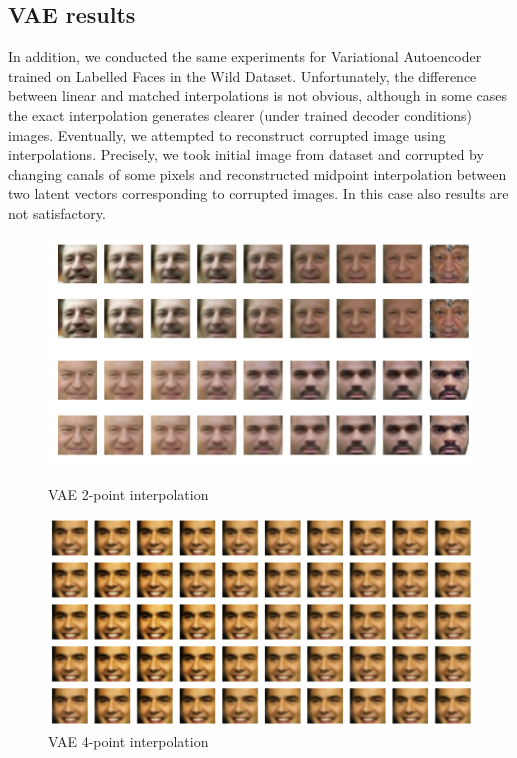 \documentclass{article}
\begin{document}
\subsection{VAE results}
In addition, we conducted the same experiments for Variational Autoencoder trained on Labelled Faces in the Wild Dataset. Unfortunately, the difference between linear and matched interpolations is not obvious, although in some cases the exact interpolation generates clearer (under trained decoder conditions) images. Eventually, we attempted to reconstruct corrupted image using interpolations. Precisely, we took initial image from dataset and corrupted by changing canals of some pixels and reconstructed midpoint interpolation between two latent vectors corresponding to corrupted images. In this case also results are not satisfactory. 



\begin{center}
\begin{figure}
    \includegraphics[width=\linewidth]{report/vae_int2_1.png}
    \includegraphics[width=\linewidth]{report/vae_int2_2.png}
    \caption{VAE 2-point interpolation}
\end{figure}
\end{center}

\begin{center}
\begin{figure}
    \includegraphics[width=\linewidth]{report/vae_int4.png}
    \caption{VAE 4-point interpolation}
\end{figure}
\end{center}
\end{document}
